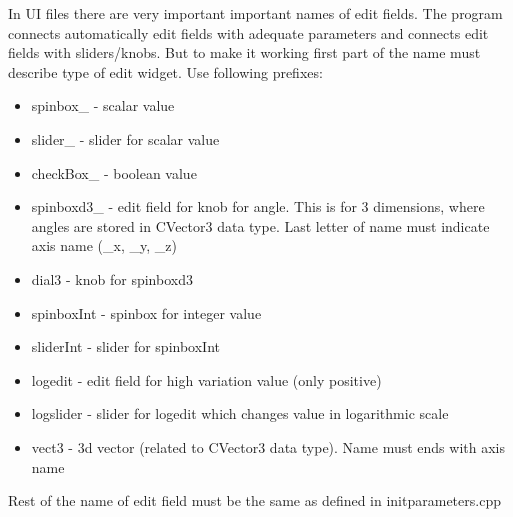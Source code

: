 In UI files there are very important important names of edit fields. The program connects automatically edit fields with adequate parameters and connects edit fields with sliders/knobs. But to make it working first part of the name must describe type of edit widget. Use following prefixes:
\begin{itemize}
	\item spinbox\_ - scalar value
	\item slider\_ - slider for scalar value
	\item checkBox\_ - boolean value
	\item spinboxd3\_ - edit field for knob for angle. This is for 3 dimensions, 
		where angles are stored in CVector3 data type. Last letter of name must indicate axis name (\_x, \_y, \_z)
	\item dial3 - knob for spinboxd3
	\item spinboxInt - spinbox for integer value
	\item sliderInt - slider for spinboxInt
	\item logedit - edit field for high variation value (only positive)
	\item logslider - slider for logedit which changes value in logarithmic scale
	\item vect3 - 3d vector (related to CVector3 data type). Name must ends with axis name
\end{itemize}

Rest of the name of edit field must be the same as defined in initparameters.cpp
